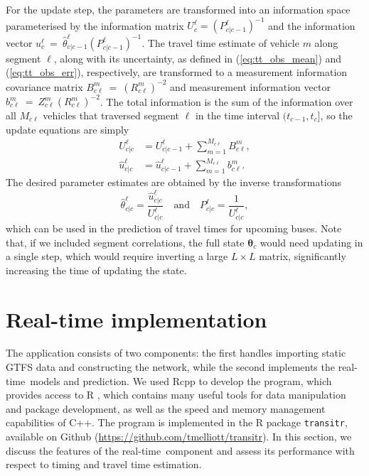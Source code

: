 \documentclass[times, doublespace]{anzsauth}
\newcommand{\rt}{real-time\ }
\begin{document}
For the update step, the parameters are transformed into an information
space parameterised by the information matrix $U^\ell_c = (P_{c|c-1}^\ell)^{-1}$
and the information vector $u^\ell_c~=~\hat \theta^\ell_{c|c-1} (P^\ell_{c|c-1})^{-1}$.
The travel time estimate of vehicle $m$ along segment $\ell$,
along with its uncertainty,
as defined in (\ref{eq:tt_obs_mean}) and (\ref{eq:tt_obs_err}), respectively,
are transformed to a measurement information covariance matrix
$B_{c\ell}^{m}~=~(R_{c\ell}^m)^{-2}$
and measurement information vector $b_{c\ell}^{m}~=~Z_{c\ell}^{m} (R_{c\ell}^{m})^{-2}$.
The total information is the sum of the information over all $M_{c\ell}$ vehicles
that traversed segment $\ell$ in the time interval $(t_{c-1}, t_c]$,
so the update equations are simply
\begin{align*}
U^\ell_{c|c} &= U^\ell_{c|c-1} + \sum_{m=1}^{M_{c\ell}} B_{c\ell}^{m}, \\
\hat u^\ell_{c|c} &= \hat u^\ell_{c|c-1} + \sum_{m=1}^{M_{c\ell}} b_{c\ell}^{m}.
\end{align*}
The desired parameter estimates are obtained
by the inverse transformations
\begin{equation*}
\hat \theta^\ell_{c|c} = \frac{\hat u^\ell_{c|c}}{U^\ell_{c|c}}
\quad\text{and}\quad
P^\ell_{c|c} = \frac{1}{U^\ell_{c|c}},
\end{equation*}
which can be used in the prediction of travel times
for upcoming buses.
Note that, if we included segment correlations,
the full state $\boldsymbol{\theta}_c$ would need updating in a single step,
which would require inverting a large $L\times L$ matrix,
significantly increasing the time of updating the state.


\section{Real-time implementation}
\label{sec:rt}

The application consists of two components:
the first handles importing static GTFS data and constructing the network,
while the second implements the \rt models and prediction.
We used \textsf{Rcpp} \citep{Rcpp}
to develop the program,
which provides access to \textsf{R} \citep{rcore},
which contains many useful tools for data manipulation and package development,
as well as the speed and memory management capabilities of \textsf{C++}.
The program is implemented in the \textsf{R} package
\verb+transitr+, available on Github (\url{https://github.com/tmelliott/transitr}).
In this section, we discuss the features of the \rt component
and assess its performance
with respect to timing and travel time estimation.
\end{document}
